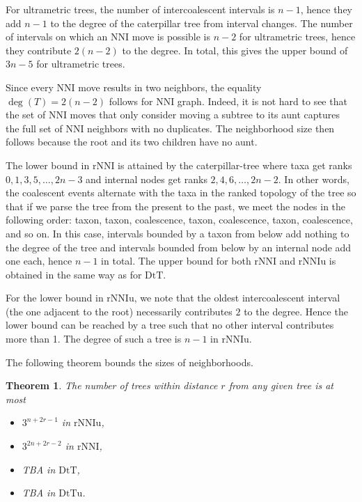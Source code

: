 \documentclass{amsart}
\newtheorem{theorem}[lemma]{Theorem}
\theoremstyle{definition}
\newcommand{\nni}{\mathrm{NNI}}
\newcommand{\rnni}{\mathrm{rNNI}}
\newcommand{\rnniu}{\mathrm{rNNIu}}
\newcommand{\dtt}{\mathrm{DtT}}
\newcommand{\dttu}{\mathrm{DtTu}}
\begin{document}
For ultrametric trees, the number of intercoalescent intervals is $n-1$, hence they add $n-1$ to the degree of the caterpillar tree from interval changes.
The number of intervals on which an NNI move is possible is $n-2$ for ultrametric trees, hence they contribute $2(n-2)$ to the degree.
In total, this gives the upper bound of $3n-5$ for ultrametric trees.

Since every $\nni$ move results in two neighbors, the equality $\deg(T) = 2(n-2)$ follows for $\nni$ graph.
Indeed, it is not hard to see that the set of NNI moves that only consider moving a subtree to its aunt captures the full set of NNI neighbors with no duplicates.
The neighborhood size then follows because the root and its two children have no aunt.

The lower bound in $\rnni$ is attained by the caterpillar-tree where taxa get ranks $0, 1, 3, 5, \ldots, 2n-3$ and internal nodes get ranks $2, 4, 6, \ldots, 2n-2$.
In other words, the coalescent events alternate with the taxa in the ranked topology of the tree so that if we parse the tree from the present to the past, we meet the nodes in the following order: taxon, taxon, coalescence, taxon, coalescence, taxon, coalescence, and so on.
In this case, intervals bounded by a taxon from below add nothing to the degree of the tree and intervals bounded from below by an internal node add one each, hence $n-1$ in total.
The upper bound for both $\rnni$ and $\rnniu$ is obtained in the same way as for $\dtt$.

For the lower bound in $\rnniu$, we note that the oldest intercoalescent interval (the one adjacent to the root) necessarily contributes $2$ to the degree.
Hence the lower bound can be reached by a tree such that no other interval contributes more than 1.
The degree of such a tree is $n-1$ in $\rnniu$.
\endproof

The following theorem bounds the sizes of neighborhoods.

\begin{theorem}\label{neighSizeTh}
The number of trees within distance $r$ from any given tree is at most
\begin{itemize}
\item[] $3^{n+2r-1}$ in $\rnniu$,
\item[] $3^{2n+2r-2}$ in $\rnni$,
\item[] TBA in $\dtt$,
\item[] TBA in $\dttu$.
\end{itemize}
\end{theorem}
\end{document}
